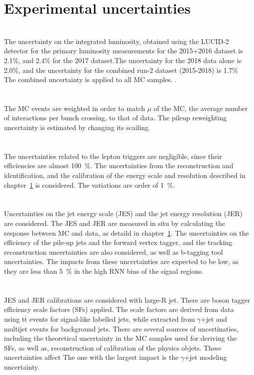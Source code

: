 \section{Experimental uncertainties}
\noindent\textbf{}\\
The uncertainty on the integrated luminosity, obtained using the LUCID-2 detector for the primary luminosity measurements for the 2015+2016 dataset is 2.1\%, and 2.4\% for the 2017 dataset.The uncertainty for the 2018 data alone is 2.0\%, and the uncertainty for the combined run-2 dataset (2015-2018) is 1.7\% The combined uncertainty is applied to all MC samples. \cite{AtlasLumiRun2}. \\ 
\\
\noindent\textbf{}\\
The MC events are weighted in order to match $\mu$ of the MC, the average number of interactions per bunch crossing, to that of data. 
The pileup reweighting uncertainty is estimated by changing its scailing. \\
\\
\noindent\textbf{}\\
The uncertainties related to the lepton triggers are negligible, since their efficiencies are almost 100~\%.
The uncertainties from the reconstruction and identification, and the calibration of the energy scale and resolution described in chapter~\ref{} is considered. The vatiations are order of 1~\%. \\
\\
\noindent\textbf{}\\
Uncertainties on the jet energy scale (JES)  and the jet energy resolution (JER) are considered.
The JES and JER are measured in situ by calculating the response between MC and data, as detaild in chapter~\ref{}. 
The uncertainties on the efficiency of the pile-up jets and the forward vertex tagger, and the tracking reconstruction uncertainties are also considered, as well as b-tagging tool uncertainties.
The impacts from these uncertainties are expected to be low, as they are less than 5~\% in the high RNN bins of the signal regions. \\
\\
\noindent\textbf{}\\
JES and JER calibrations are considered with large-R jet.  
There are boson tagger efficiency scale factors (SFs) \cite{} applied. The scale factors are derived from data using t$\bar{\mathrm{t}}$ events for signal-like labelled jets, while extracted from $\gamma$+jet and multijet events for background jets.
There are several sources of uncertinaties, including the theoretical uncertainty in the MC samples used for deriving the SFs, as well as, reconstruction of calibration of the physics objets. These uncertainties affect 
The one with the largest impact is the $\gamma$+jet modeling uncertainty.

